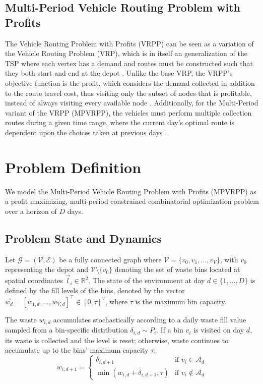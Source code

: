 \documentclass[orivec,runningheads]{llncs}
\begin{document}
\begin{center}
\begin{longtable}
\subsection{Multi-Period Vehicle Routing Problem with Profits}
The Vehicle Routing Problem with Profits (VRPP) can be seen as a variation of the Vehicle Routing Problem (VRP), which is in itself an generalization of the TSP where each vertex has a demand and routes must be constructed such that they both start and end at the depot \cite{Kool2018AttentionLT,wu2024neural}. Unlike the base VRP, the VRPP's objective function is the profit, which considers the demand collected in addition to the route travel cost, thus visiting only the subset of nodes that is profitable, instead of always visiting every available node \cite{doi:10.1137/1.9781611973594.ch10}. Additionally, for the Multi-Period variant of the VRPP (MPVRPP), the vehicles must perform multiple collection routes during a given time range, where the current day's optimal route is dependent upon the choices taken at previous days \cite{DBLP:journals/eor/ZhangCCLQ13}.

\section{Problem Definition}
We model the Multi-Period Vehicle Routing Problem with Profits (MPVRPP) as a profit maximizing, multi-period constrained combinatorial optimization problem over a horizon of $D$ days. 

\subsection{Problem State and Dynamics}
Let $\mathcal{G} = (\mathcal{V}, \mathcal{E})$ be a fully connected graph where $\mathcal{V} = \{v_0, v_1, \dots, v_V \}$, with $v_0$ representing the depot and $\mathcal{V} \setminus \{v_0\}$ denoting the set of waste bins located at spatial coordinates $\vec{l}_i \in \mathbb{R}^2$. The state of the environment at day $d \in \{1, \dots, D\}$ is defined by the fill levels of the bins, denoted by the vector $\vec{w}_d = [w_{1, d}, \dots, w_{V, d}]^\top \in [0, \tau]^V$, where $\tau$ is the maximum bin capacity.

The waste $w_{i,d}$ accumulates stochastically according to a daily waste fill value sampled from a bin-specific distribution $\delta_{i,d} \sim P_i$. If a bin $v_i$ is visited on day $d$, its waste is collected and the level is reset; otherwise, waste continues to accumulate up to the bins' maximum capacity $\tau$:
\begin{equation}
    w_{i, d+1} = 
    \begin{cases} 
        \delta_{i, d+1} & \text{if } v_i \in \mathcal{A}_d \\
        \min(w_{i, d} + \delta_{i, d+1}, \tau) & \text{if } v_i \notin \mathcal{A}_d
    \end{cases}
\end{equation}


\end{longtable}
\end{center}
\end{document}

